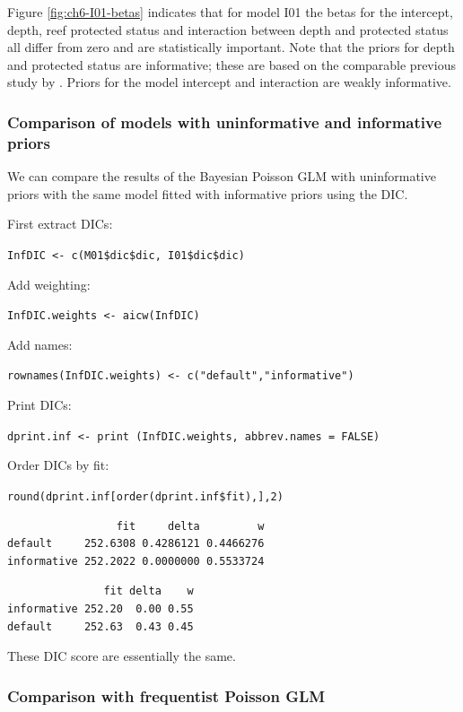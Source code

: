\documentclass[
]{book}
\begin{document}
Figure \ref{fig:ch6-I01-betas} indicates that for model I01 the betas for the intercept, depth, reef protected status and interaction between depth and protected status all differ from zero and are statistically important. Note that the priors for depth and protected status are informative; these are based on the comparable previous study by \citet{Waheed_2015}. Priors for the model intercept and interaction are weakly informative.

\hypertarget{nb-prior-comp}{%
\subsubsection{Comparison of models with uninformative and informative priors}\label{nb-prior-comp}}

We can compare the results of the Bayesian Poisson GLM with uninformative priors with the same model fitted with informative priors using the DIC.

First extract DICs:

\texttt{InfDIC\ \textless{}-\ c(M01\$dic\$dic,\ I01\$dic\$dic)}

Add weighting:

\texttt{InfDIC.weights\ \textless{}-\ aicw(InfDIC)}

Add names:

\texttt{rownames(InfDIC.weights)\ \textless{}-\ c("default","informative")}

Print DICs:

\texttt{dprint.inf\ \textless{}-\ print\ (InfDIC.weights,\ abbrev.names\ =\ FALSE)}

Order DICs by fit:

\texttt{round(dprint.inf{[}order(dprint.inf\$fit),{]},2)}

\begin{verbatim}
                 fit     delta         w
default     252.6308 0.4286121 0.4466276
informative 252.2022 0.0000000 0.5533724
\end{verbatim}

\begin{verbatim}
               fit delta    w
informative 252.20  0.00 0.55
default     252.63  0.43 0.45
\end{verbatim}

These DIC score are essentially the same.

\hypertarget{nb-freq-comp}{%
\subsubsection{Comparison with frequentist Poisson GLM}\label{nb-freq-comp}}
\end{document}
